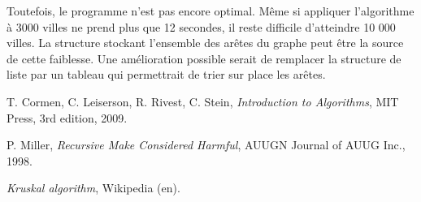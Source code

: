 \documentclass[a4paper]{article}
\begin{document}
Toutefois, le programme n'est pas encore optimal. Même si appliquer l'algorithme à 3000 villes ne prend plus que 12 secondes, il reste difficile d'atteindre 10 000 villes. La structure stockant l'ensemble des arêtes du graphe peut être la source de cette faiblesse. Une amélioration possible serait de remplacer la structure de liste par un tableau qui permettrait de trier sur place les arêtes.

\begin{thebibliography}{00}

  T. Cormen, C. Leiserson, R. Rivest, C. Stein,
  \textit{Introduction to Algorithms},
  MIT Press,
  3rd edition,
  2009.

  P. Miller,
  \textit{Recursive Make Considered Harmful},
  AUUGN Journal of AUUG Inc.,
  1998.

  \textit{Kruskal algorithm},
  Wikipedia (en).

\end{thebibliography}
\end{document}
